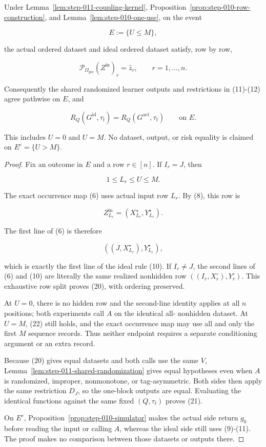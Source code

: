 \begin{proposition}\label{prop:step-011-no-overflow-identity}
Under Lemma~\ref{lem:step-011-coupling-kernel}, Proposition~\ref{prop:step-010-row-construction}, and Lemma~\ref{lem:step-010-one-use}, on the event

\[
  E:=\{U\le M\},
\tag{19}
\]

the actual ordered dataset and ideal ordered dataset satisfy, row by row,

\[
  \mathcal P_{\Omega_{\mathrm{pre}}}(Z^{\mathrm{in}})_r
  =\widehat z_r,
  \qquad r=1,\ldots,n.
\tag{20}
\]

Consequently the shared randomized learner outputs and restrictions in
(11)-(12) agree pathwise on \(E\), and

\[
  R_Q(G^{\mathrm{id}},\tau_t)
  =R_Q(G^{\mathrm{act}},\tau_t)
  \qquad\text{on }E.
\tag{21}
\]

This includes \(U=0\) and \(U=M\). No dataset, output, or risk equality is
claimed on \(E^c=\{U>M\}\).
\end{proposition}

\begin{proof}
Fix an outcome in \(E\) and a row \(r\in[n]\). If \(I_r=J\), then

\[
  1\le L_r\le U\le M.
\tag{22}
\]

The exact occurrence map (6) uses actual input row \(L_r\).
By (8), this row is

\[
  Z^{\mathrm{in}}_{L_r}
  =(X_{L_r}^\star,Y_{L_r}^\star).
\]

The first line of (6) is therefore

\[
  ((J,X_{L_r}^\star),Y_{L_r}^\star),
\]

which is exactly the first line of the ideal rule (10). If \(I_r\ne J\),
the second lines of (6) and (10) are literally the same realized
nonhidden row \(((I_r,X_r^\circ),Y_r^\circ)\). This exhaustive row split
proves (20), with ordering preserved.

At \(U=0\), there is no hidden row and the second-line identity applies at
all \(n\) positions; both experiments call \(A\) on the identical all-
nonhidden dataset. At \(U=M\), (22) still holds, and the exact occurrence
map may use all and only the first \(M\) sequence records. Thus neither
endpoint requires a separate conditioning argument or an extra record.

Because (20) gives equal datasets and both calls use the same \(V\),
Lemma~\ref{lem:step-011-shared-randomization} gives equal hypotheses even when
\(A\) is randomized, improper, nonmonotone, or tag-asymmetric. Both sides
then apply the same restriction \(D_J\), so the one-block outputs are
equal. Evaluating the identical functions against the same fixed
\((Q,\tau_t)\) proves (21).

On \(E^c\), Proposition~\ref{prop:step-010-simulator} makes the
actual side return \(g_0\) before reading the input or calling \(A\),
whereas the ideal side still uses (9)-(11). The proof makes no comparison
between those datasets or outputs there. \end{proof}

